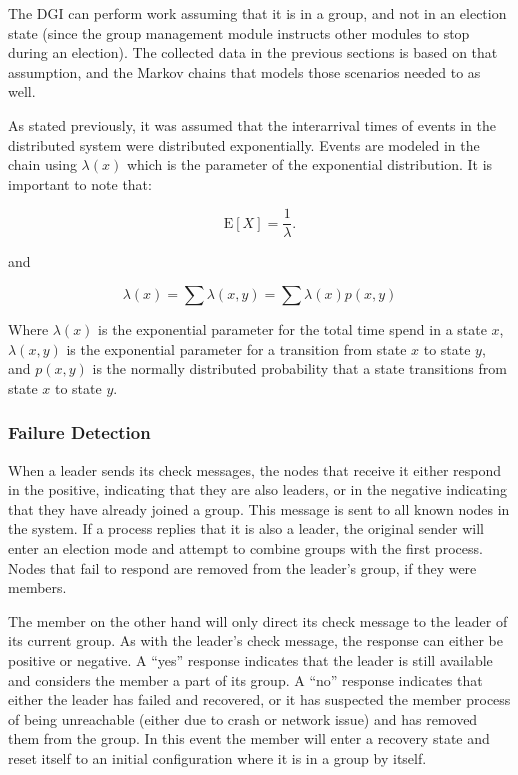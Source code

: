 The DGI can perform work assuming that it is in a group, and not in an election
state (since the group management module instructs other modules to stop during
an election). The collected data in the previous sections is based on that
assumption, and the Markov chains that models those scenarios needed to as
well.

As stated previously, it was assumed that the interarrival times of events in the distributed system
were distributed exponentially. Events are modeled in the chain
using $\lambda(x)$ which is the parameter of the exponential distribution. It
is important to note that:

\begin{equation}
\mathrm{E}[X] = \frac{1}{\lambda}. \!
\end{equation}

and

\begin{equation}
\lambda(x) = \sum \lambda(x,y) = \sum \lambda(x) p(x,y)
\end{equation}

Where $\lambda(x)$ is the exponential parameter for the total time spend in
a state $x$, $\lambda(x,y)$ is the exponential parameter for a transition from
state $x$ to state $y$, and $p(x,y)$ is the normally distributed probability that
a state transitions from state $x$ to state $y$.

\subsubsection{Failure Detection}
When a leader sends its check messages, the nodes that receive it either
respond in the positive, indicating that they are also leaders, or in the
negative indicating that they have already joined a group. This message is sent
to all known nodes in the system. If a process replies that it is also a
leader, the original sender will enter an election mode and attempt to combine
groups with the first process. Nodes that fail to respond are removed from the
leader's group, if they were members.

The member on the other hand will only direct its check message to the leader
of its current group. As with the leader's check message, the response can
either be positive or negative. A ``yes'' response indicates that the leader is
still available and considers the member a part of its group. A ``no'' response
indicates that either the leader has failed and recovered, or it has suspected
the member process of being unreachable (either due to crash or network issue)
and has removed them from the group. In this event the member will enter a
recovery state and reset itself to an initial configuration where it is in a
group by itself.

